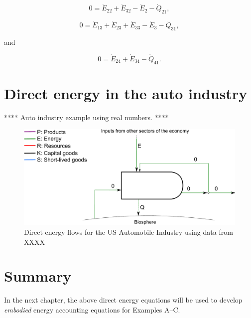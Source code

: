 \begin{equation} \label{eq:C-CV_E_dot_2_SS}
	0
	= \dot{E}_{22}
	+ \dot{E}_{32}
	- \dot{E}_{2}
	- \dot{Q}_{21},
\end{equation}

\begin{equation} \label{eq:C-CV_E_dot_3_SS}
	0
	= \dot{E}_{13} 
	+ \dot{E}_{23}
	+ \dot{E}_{33} 
	- \dot{E}_{3} 
	- \dot{Q}_{31},
\end{equation}

\noindent and 

\begin{equation} \label{eq:C-CV_E_dot_4_SS}
	0
	= \dot{E}_{24}
	+ \dot{E}_{34} 
	- \dot{Q}_{41}.
\end{equation}

\section{Direct energy in the auto industry}
\label{sec:energy_auto}

**** Auto industry example using real numbers. ****

\begin{figure}[h!]
\centering
\includegraphics[width=0.8\linewidth]{Part_2/Chapter_Energy/images/PERKS_basic_unit_energy_auto_ind.pdf}
\caption{Direct energy flows for the US Automobile Industry using data from XXXX}
\label{fig:PERKS_energy_auto}
\end{figure}

\section{Summary}
\label{sec:energy_summary}

In the next chapter, the above direct energy equations will be used to 
develop \emph{embodied} energy accounting equations for Examples A--C.






